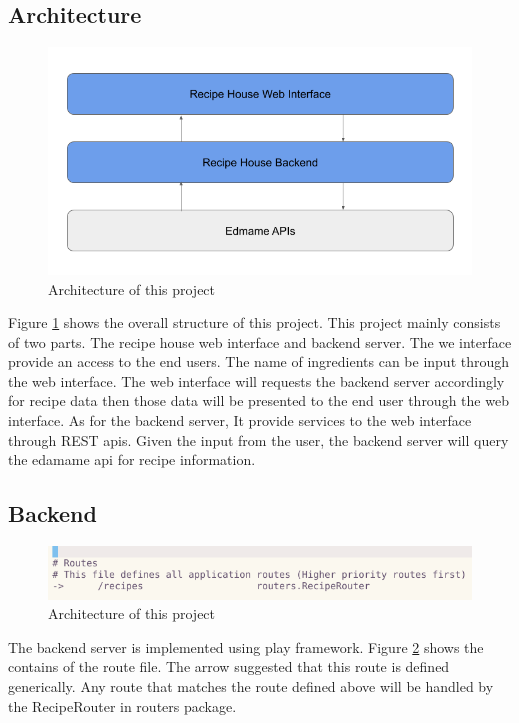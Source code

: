 \documentclass{article}
\begin{document}
\begin{normalsize}
  \subsection{Architecture}
  \begin{figure}[H]
    \centeringng
    \centerline{\includegraphics[scale=0.4]{archi}}
    \caption{Architecture of this project}
    \label{fig:architecture}
  \end{figure}

  Figure \ref{fig:architecture} shows the overall structure of this project.
  This project mainly consists of two parts. The recipe house web interface and
  backend server. The we interface provide an access to the end users. The name
  of ingredients can be input through the web interface. The web interface will
  requests the backend server accordingly for recipe data then those data will
  be presented to the end user through the web interface. As for the backend
  server, It provide services to the web interface through REST apis. Given the
  input from the user, the backend server will query the edamame api for recipe
  information. 

  \subsection{Backend}
  \begin{figure}[H]
    \centeringng
    \centerline{\includegraphics[scale=0.8]{route}}
    \caption{Architecture of this project}
    \label{fig:route}
  \end{figure}
  The backend server is implemented using play framework. Figure \ref{fig:route}
  shows the contains of the route file. The arrow suggested that this route is
  defined generically. Any route that matches the route defined above will be
  handled by the RecipeRouter in routers package.


\end{normalsize}
\end{document}
